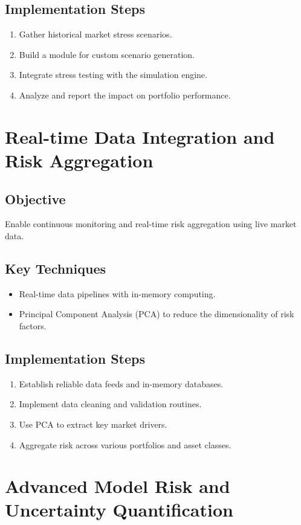 \documentclass[11pt]{article}
\begin{document}
\subsection{Implementation Steps}
\begin{enumerate}
    \item Gather historical market stress scenarios.
    \item Build a module for custom scenario generation.
    \item Integrate stress testing with the simulation engine.
    \item Analyze and report the impact on portfolio performance.
\end{enumerate}

\section{Real-time Data Integration and Risk Aggregation}
\subsection{Objective}
Enable continuous monitoring and real-time risk aggregation using live market data.

\subsection{Key Techniques}
\begin{itemize}
    \item Real-time data pipelines with in-memory computing.
    \item Principal Component Analysis (PCA) to reduce the dimensionality of risk factors.
\end{itemize}

\subsection{Implementation Steps}
\begin{enumerate}
    \item Establish reliable data feeds and in-memory databases.
    \item Implement data cleaning and validation routines.
    \item Use PCA to extract key market drivers.
    \item Aggregate risk across various portfolios and asset classes.
\end{enumerate}

\section{Advanced Model Risk and Uncertainty Quantification}
\end{document}
